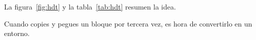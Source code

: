 La figura~\ref{fig:hdt} y la tabla~\ref{tab:hdt} resumen la idea.

\begin{aviso}
  Cuando copies y pegues un bloque por tercera vez, es hora de
  convertirlo en un entorno.
\end{aviso}

